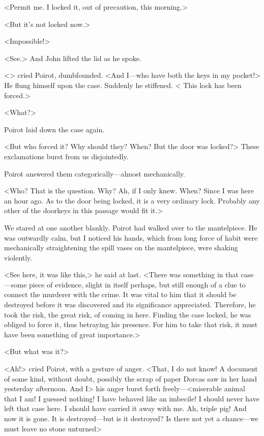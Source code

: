  <Permit me. I locked it, out of precaution, this morning.> 

 <But it's not locked now.> 

 <Impossible!> 

 <See.> And John lifted the lid as he spoke. 

 <> cried Poirot, dumbfounded. <And I—who have both the keys in my pocket!> He flung himself upon the case. Suddenly he stiffened. < This lock has been forced.> 

 <What?> 

 Poirot laid down the case again. 

 <But who forced it? Why should they? When? But the door was locked?> These exclamations burst from us disjointedly. 

 Poirot answered them categorically—almost mechanically. 

 <Who? That is the question. Why? Ah, if I only knew. When? Since I was here an hour ago. As to the door being locked, it is a very ordinary lock. Probably any other of the doorkeys in this passage would fit it.> 

 We stared at one another blankly. Poirot had walked over to the mantelpiece. He was outwardly calm, but I noticed his hands, which from long force of habit were mechanically straightening the spill vases on the mantelpiece, were shaking violently. 

 <See here, it was like this,> he said at last. <There was something in that case—some piece of evidence, slight in itself perhaps, but still enough of a clue to connect the murderer with the crime. It was vital to him that it should be destroyed before it was discovered and its significance appreciated. Therefore, he took the risk, the great risk, of coming in here. Finding the case locked, he was obliged to force it, thus betraying his presence. For him to take that risk, it must have been something of great importance.> 

 <But what was it?> 

 <Ah!> cried Poirot, with a gesture of anger. <That, I do not know! A document of some kind, without doubt, possibly the scrap of paper Dorcas saw in her hand yesterday afternoon. And I\longdash> his anger burst forth freely—<miserable animal that I am! I guessed nothing! I have behaved like an imbecile! I should never have left that case here. I should have carried it away with me. Ah, triple pig! And now it is gone. It is destroyed—but is it destroyed? Is there not yet a chance—we must leave no stone unturned\longdash> 

